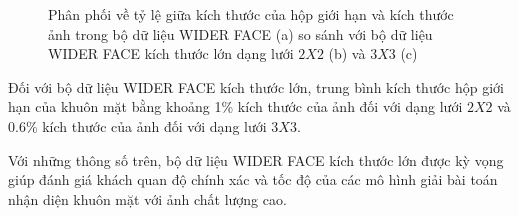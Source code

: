 {\begin{figure}[H]
        \caption{Phân phối về tỷ lệ giữa kích thước của hộp giới hạn và kích thước ảnh trong bộ dữ liệu WIDER FACE \cite{yang2016wider} (a) so sánh với bộ dữ liệu WIDER FACE kích thước lớn dạng lưới $2 X 2$ (b) và $3 X 3$ (c)}
        \label{fig:widerface_4k_scale}
    \end{figure}

    \noindent
    Đối với bộ dữ liệu WIDER FACE kích thước lớn, trung bình kích thước hộp giới hạn của khuôn mặt bằng khoảng 1\% kích thước của ảnh đối với dạng lưới $2 X 2$ và 0.6\% kích thước của ảnh đối với dạng lưới $3 X 3$.

    \noindent
    Với những thông số trên, bộ dữ liệu WIDER FACE kích thước lớn được kỳ vọng giúp đánh giá khách quan độ chính xác và tốc độ của các mô hình giải bài toán nhận diện khuôn mặt với ảnh chất lượng cao.
}